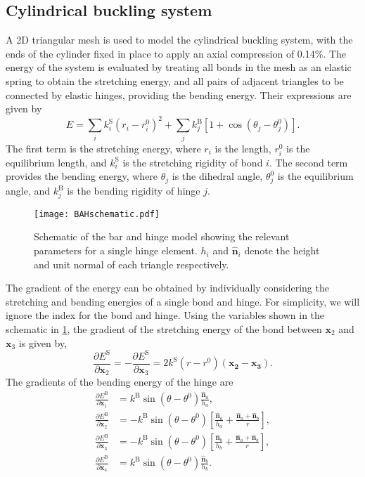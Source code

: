 \documentclass[aip,jcp,reprint,twocolumn]{revtex4-1}
\begin{document}
\subsection{Cylindrical buckling system}
A 2D triangular mesh is used to model the cylindrical buckling system, with the ends of the cylinder fixed in place to apply an axial compression of 0.14\%.
The energy of the system is evaluated by treating all bonds in the mesh as an elastic spring to obtain the stretching energy, and all pairs of adjacent triangles to be connected by elastic hinges, providing the bending energy.
Their expressions are given by
\begin{equation}
  E = \sum_i k^\mathrm{S}_i (r_i - r^0_i)^2 + \sum_j k^\mathrm{B}_j [1 + \cos(\theta_j - \theta^0_j)].
\end{equation}
The first term is the stretching energy, where $r_i$ is the length, $r^0_i$ is the equilibrium length, and $k^\mathrm{S}_i$ is the stretching rigidity of bond $i$.
The second term provides the bending energy, where $\theta_j$ is the dihedral angle, $\theta^0_j$ is the equilibrium angle, and $k^\mathrm{B}_j$ is the bending rigidity of hinge $j$.

\begin{figure}[htb]
  \texttt{[image: BAHschematic.pdf]}
  \caption{\label{fig:BAHschematic}
    Schematic of the bar and hinge model showing the relevant parameters for a single hinge element.
    $h_i$ and $\bm{\hat{n}}_i$ denote the height and unit normal of each triangle respectively.
  }
\end{figure}
The gradient of the energy can be obtained by individually considering the stretching and bending energies of a single bond and hinge.
For simplicity, we will ignore the index for the bond and hinge.
Using the variables shown in the schematic in \cref{fig:BAHschematic}, the gradient of the stretching energy of the bond between $\bm{x}_2$ and $\bm{x}_3$ is given by,
\begin{equation}
  \frac{\partial E^\mathrm{S}}{\partial \bm{x}_2} = - \frac{\partial E^\mathrm{S}}{\partial \bm{x}_3} =
    2 k^\mathrm{S} (r - r^0) (\bm{x_2} - \bm{x_3}).
\end{equation}
The gradients of the bending energy of the hinge are
\begin{align}
  \frac{\partial E^\mathrm{B}}{\partial \bm{x}_1} &= k^\mathrm{B} \sin(\theta - \theta^0) \frac{\bm{\hat{n}}_a}{h_a}, \\
  \frac{\partial E^\mathrm{B}}{\partial \bm{x}_2} &= - k^\mathrm{B} \sin(\theta - \theta^0) \left[\frac{\bm{\hat{n}}_a}{h_a} + \frac{\bm{\hat{n}}_a + \bm{\hat{n}}_b}{r}\right], \\
  \frac{\partial E^\mathrm{B}}{\partial \bm{x}_3} &= - k^\mathrm{B} \sin(\theta - \theta^0) \left[\frac{\bm{\hat{n}}_b}{h_b} + \frac{\bm{\hat{n}}_a + \bm{\hat{n}}_b}{r}\right], \\
  \frac{\partial E^\mathrm{B}}{\partial \bm{x}_4} &= k^\mathrm{B} \sin(\theta - \theta^0) \frac{\bm{\hat{n}}_b}{h_b}.
\end{align}
\end{document}
